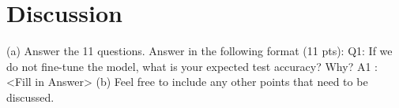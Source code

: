 \section*{Discussion}

(a) Answer the 11 questions. Answer in the following format (11 pts):
Q1: If we do not fine-tune the model, what is your expected test accuracy? Why? A1 : <Fill in Answer>
(b) Feel free to include any other points that need to be discussed.
